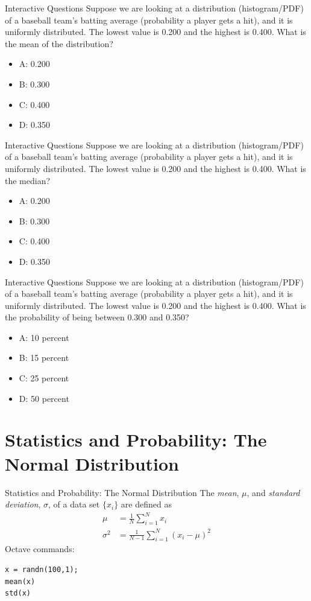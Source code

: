 \documentclass{beamer}
\begin{document}
\begin{frame}{Interactive Questions}
Suppose we are looking at a distribution (histogram/PDF) of a baseball team's batting average (probability a player gets a hit), and it is uniformly distributed.  The lowest value is 0.200 and the highest is 0.400.  What is the mean of the distribution?
\begin{itemize}
\item A: 0.200
\item B: 0.300
\item C: 0.400
\item D: 0.350
\end{itemize}
\end{frame}

\begin{frame}{Interactive Questions}
Suppose we are looking at a distribution (histogram/PDF) of a baseball team's batting average (probability a player gets a hit), and it is uniformly distributed.  The lowest value is 0.200 and the highest is 0.400.  What is the median?
\begin{itemize}
\item A: 0.200
\item B: 0.300
\item C: 0.400
\item D: 0.350
\end{itemize}
\end{frame}

\begin{frame}{Interactive Questions}
Suppose we are looking at a distribution (histogram/PDF) of a baseball team's batting average (probability a player gets a hit), and it is uniformly distributed.  The lowest value is 0.200 and the highest is 0.400.  What is the probability of being between 0.300 and 0.350?
\begin{itemize}
\item A: 10 percent
\item B: 15 percent
\item C: 25 percent
\item D: 50 percent
\end{itemize}
\end{frame}

\section{Statistics and Probability: The Normal Distribution}

\begin{frame}[fragile]{Statistics and Probability: The Normal Distribution}
The \textit{mean}, $\mu$, and \textit{standard deviation}, $\sigma$, of a data set $\lbrace x_i \rbrace$ are defined as
\begin{align}
\mu &= \frac{1}{N}\sum_{i=1}^N x_i \\
\sigma^2 &= \frac{1}{N-1}\sum_{i=1}^N\left(x_i-\mu\right)^2
\end{align}
Octave commands:
\begin{verbatim}
x = randn(100,1);
mean(x)
std(x)
\end{verbatim}
\end{frame}
\end{document}
